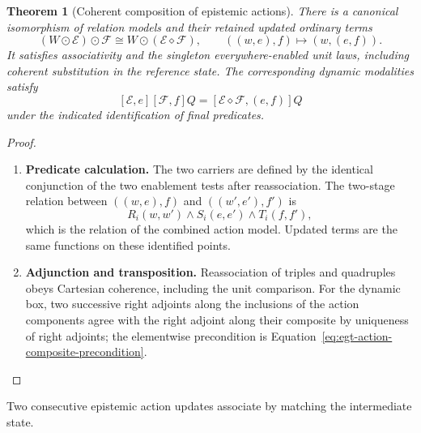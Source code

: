 \documentclass[11pt,a4paper]{article}
\numberwithin{equation}{section}
\newtheorem{theorem}{Theorem}[section]
\theoremstyle{definition}
\theoremstyle{remark}
\theoremstyle{plain}
\begin{document}
\begin{theorem}[Coherent composition of epistemic actions]
\label{thm:egt-action-composition}
There is a canonical isomorphism of relation models and their retained
updated ordinary terms
\begin{equation}\label{eq:egt-action-composition}
 (W\odot\mathcal E)\odot\mathcal F
 \cong W\odot(\mathcal E\diamond\mathcal F),
 \qquad ((w,e),f)\longmapsto(w,(e,f)).
\end{equation}
It satisfies associativity and the singleton everywhere-enabled unit
laws, including coherent substitution in the reference state. The
corresponding dynamic modalities satisfy
\[
 [\mathcal E,e][\mathcal F,f]Q
   =[\mathcal E\diamond\mathcal F,(e,f)]Q
\]
under the indicated identification of final predicates.
\end{theorem}
\begin{proof}
\leavevmode
\begin{enumerate}[label=\textup{(\arabic*)},leftmargin=*,itemsep=4pt,topsep=3pt]
  \item \textbf{Predicate calculation.} The two carriers are defined by the identical conjunction of the two
enablement tests after reassociation. The two-stage relation between
$((w,e),f)$ and $((w',e'),f')$ is
\[
 R_i(w,w')\wedge S_i(e,e')\wedge T_i(f,f'),
\]
which is the relation of the combined action model. Updated terms are
the same functions on these identified points.
  \item \textbf{Adjunction and transposition.} Reassociation of
triples and quadruples obeys Cartesian coherence, including the unit
comparison. For the dynamic box, two successive right adjoints along
the inclusions of the action components agree with the right adjoint
along their composite by uniqueness of right adjoints; the elementwise
precondition is Equation~\eqref{eq:egt-action-composite-precondition}.
\end{enumerate}
\end{proof}

\noindent Two consecutive epistemic action updates associate by matching the intermediate state.
\begin{center}
\end{center}
\end{document}
